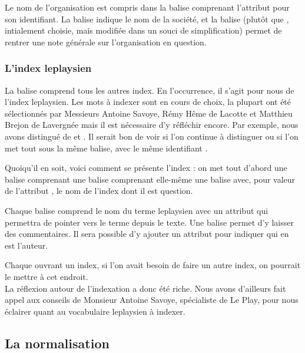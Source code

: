 Le nom de l'organisation est compris dans la balise  comprenant l'attribut  pour son identifiant. La balise  indique le nom de la société, et la balise  (plutôt que , intialement choisie, mais modifiée dans un souci de simplification) permet de rentrer une note générale sur l'organisation en question.

\subsubsection{L'index leplaysien}

La balise  comprend tous les autres index. En l'occurrence, il s'agit pour nous de l'index leplaysien. Les mots à indexer sont en cours de choix, la plupart ont été sélectionnés par Messieurs Antoine Savoye, Rémy Hême de Lacotte et Matthieu Brejon de Lavergnée mais il est nécessaire d'y réfléchir encore. Par exemple, nous avons distingué  de  et . Il serait bon de voir si l'on continue à distinguer ou si l'on met tout sous la même balise, avec le même identifiant .

Quoiqu'il en soit, voici comment se présente l'index : on met tout d'abord une balise  comprenant une balise  comprenant elle-même une balise  avec, pour valeur de l'attribut , le nom de l'index dont il est question.

Chaque balise  comprend le nom du terme leplaysien avec un attribut  qui permettra de pointer vers le terme depuis le texte. Une balise  permet d'y laisser des commentaires. Il sera possible d'y ajouter un attribut  pour indiquer qui en est l'auteur.

Chaque  ouvrant un index, si l'on avait besoin de faire un autre index, on pourrait le mettre à cet endroit.\\

La réflexion autour de l'indexation a donc été riche. Nous avons d'ailleurs fait appel aux conseils de Monsieur Antoine Savoye, spécialiste de Le Play, pour nous éclairer quant au vocabulaire leplaysien à indexer.

\subsection{La normalisation}

